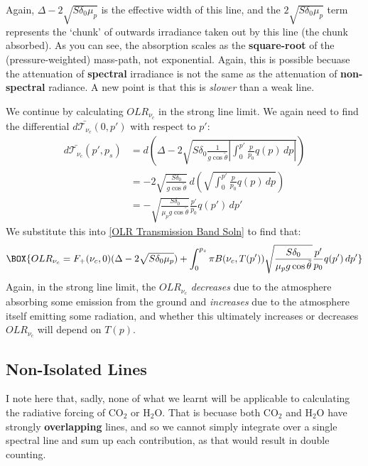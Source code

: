 Again, $\Delta-2\sqrt{S\delta_0 \mu_p}$ is the effective width of this line, and the $2\sqrt{S\delta_0 \mu_p}$ term represents the `chunk' of outwards irradiance taken out by this line (the chunk absorbed). As you can see, the absorption scales as the \textbf{square-root} of the (pressure-weighted) mass-path, not exponential. Again, this is possible becuase the attenuation of \textbf{spectral} irradiance is not the same as the attenuation of \textbf{non-spectral} radiance. A new point is that this is \textit{slower} than a weak line.

We continue by calculating $OLR_{\nu_c}$ in the strong line limit. We again need to find the differential $d\bar{\mathcal{T}_{\nu_c}}(0,p')$ with respect to $p'$:
\begin{align*}
    d\bar{\mathcal{T}_{\nu_c}}(p',p_s)&=d\left( 
        \Delta - 2\sqrt{S\delta_0\frac{1}{g\cos\tilde{\theta}}\left|
            \int_{0}^{p'}\frac{p}{p_0}q(p)\,dp
        \right|}
     \right)\\
     &= -2\sqrt{\frac{S\delta_0}{g\cos\tilde{\theta}}}\,d\left( 
        \sqrt{\int_{0}^{p'}\frac{p}{p_0}q(p)\,dp}
      \right)
     \\
     &= -\sqrt{\frac{S\delta_0}{\mu_pg\cos\tilde{\theta}}}\frac{p'}{p_0}q(p')\,dp'
\end{align*}
We substitute this into \ref{OLR Transmission Band Soln} to find that:
\begin{align}
    \label{Strong OLR}
    \BOX{OLR_{\nu_c}
    =F_+(\nu_c,0)(\Delta-2\sqrt{S\delta_0 \mu_p})+\int_{0}^{p_s}\pi B(\nu_c,T(p'))\sqrt{\frac{S\delta_0}{\mu_pg\cos\tilde{\theta}}}\frac{p'}{p_0}q(p')\,dp'}
\end{align}
Again, in the strong line limit, the $OLR_{\nu_c}$ \textit{decreases} due to the atmosphere absorbing some emission from the ground and \textit{increases} due to the atmosphere itself emitting some radiation, and whether this ultimately increases or decreases $OLR_{\nu_c}$ will depend on $T(p)$.

\subsection{Non-Isolated Lines}

I note here that, sadly, none of what we learnt will be applicable to calculating the radiative forcing of CO$_2$ or H$_2$O. That is becuase both CO$_2$ and H$_2$O have strongly \textbf{overlapping} lines, and so we cannot simply integrate over a single spectral line and sum up each contribution, as that would result in double counting.

